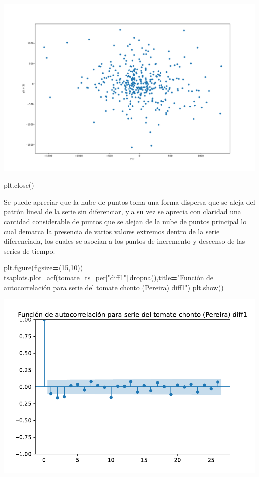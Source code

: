 \documentclass[
]{book}
\newenvironment{Shaded}{\begin{snugshade}}{\end{snugshade}}
\newcommand{\DecValTok}[1]{\textcolor[rgb]{0.00,0.00,0.81}{#1}}
\newcommand{\NormalTok}[1]{#1}
\newcommand{\OperatorTok}[1]{\textcolor[rgb]{0.81,0.36,0.00}{\textbf{#1}}}
\newcommand{\StringTok}[1]{\textcolor[rgb]{0.31,0.60,0.02}{#1}}
\begin{document}
\includegraphics{bookdown-demo_files/figure-latex/unnamed-chunk-125-115.pdf}

\begin{Shaded}
\begin{Highlighting}[]
\NormalTok{plt.close()}
\end{Highlighting}
\end{Shaded}

Se puede apreciar que la nube de puntos toma una forma dispersa que se aleja del patrón lineal de la serie sin diferenciar, y a su vez se aprecia con claridad una cantidad considerable de puntos que se alejan de la nube de puntos principal lo cual demarca la presencia de varios valores extremos dentro de la serie diferenciada, los cuales se asocian a los puntos de incremento y descenso de las series de tiempo.

\begin{Shaded}
\begin{Highlighting}[]

\NormalTok{plt.figure(figsize}\OperatorTok{=}\NormalTok{(}\DecValTok{15}\NormalTok{,}\DecValTok{10}\NormalTok{))}
\NormalTok{tsaplots.plot\_acf(tomate\_ts\_per[}\StringTok{"diff1"}\NormalTok{].dropna(),title}\OperatorTok{=}\StringTok{"Función de autocorrelación para serie del tomate chonto (Pereira) diff1"}\NormalTok{)}
\NormalTok{plt.show()}
\end{Highlighting}
\end{Shaded}

\includegraphics{bookdown-demo_files/figure-latex/unnamed-chunk-126-117.pdf}
\end{document}
